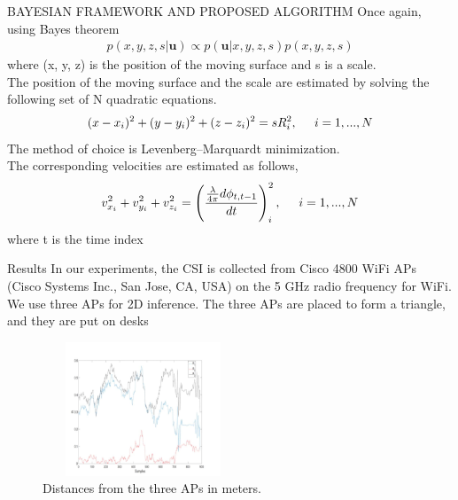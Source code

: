 \documentclass{beamer}
\providecommand{\brak}[1]{\ensuremath{\left(#1\right)}}
\begin{document}
\begin{frame}{BAYESIAN FRAMEWORK AND PROPOSED ALGORITHM}
Once again, using
Bayes theorem
\begin{align}
       \mathit{p}(x,y,z,s|\boldsymbol{u})\propto \mathit{p}(\boldsymbol{u}|x,y,z,s)\mathit{p}(x,y,z,s)
   \end{align} 
   where (x, y, z) is the position of the moving surface and s is a
scale.\\
The position of the moving surface and the scale are
estimated by solving the following set of N quadratic
equations.
\begin{align}
    (x-x_i)^2+(y-y_i)^2+(z-z_i)^2=sR_i^2,\hspace{0.5cm}
    i=1,...,N
    \end{align}
The method of choice is Levenberg–Marquardt minimization.\\
The corresponding velocities are estimated as follows,
 \begin{align}
        v_{x_i}^2+v_{y_i}^2+v_{z_i}^2= \brak{\frac{\frac{\lambda}{4\pi}d\phi_{t,t-1}}{dt}}_{i}^2,\hspace{0.5cm} i=1,...,N
    \end{align}
    where t is the time index

\end{frame}
\begin{frame}{Results}
   In our experiments, the CSI is collected from Cisco 4800 WiFi APs (Cisco Systems Inc., San Jose, CA, USA) on the 5 GHz radio frequency for WiFi. \\
   We use three APs for 2D inference. The three APs are placed to form a triangle, and they are put on desks
   \begin{figure}[h]
    \centering
    \includegraphics[width=6cm, height=4cm]{Result1.jpeg}
    \caption{Distances from the three APs in meters.}
    \label{fig:Result1}
\end{figure}
\end{frame}
\end{document}
